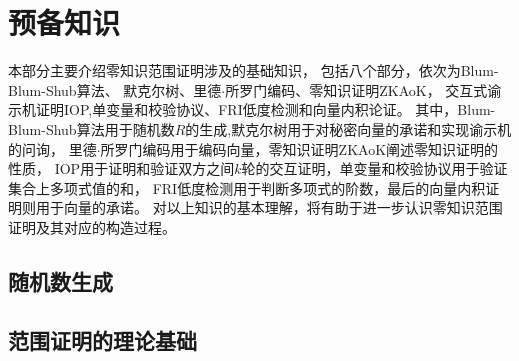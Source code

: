 \documentclass[zihao=-4]{ctexart}
\begin{document}

\section{预备知识}
本部分主要介绍零知识范围证明涉及的基础知识，
包括八个部分，依次为Blum-Blum-Shub算法、
默克尔树、里德$\cdot$所罗门编码、零知识证明ZKAoK，
交互式谕示机证明IOP,单变量和校验协议、FRI低度检测和向量内积论证。
其中，Blum-Blum-Shub算法用于随机数$R$的生成,默克尔树用于对秘密向量的承诺和实现谕示机的问询，
里德$\cdot$所罗门编码用于编码向量，零知识证明ZKAoK阐述零知识证明的性质，
IOP用于证明和验证双方之间$k$轮的交互证明，单变量和校验协议用于验证集合上多项式值的和，
FRI低度检测用于判断多项式的阶数，最后的向量内积证明则用于向量的承诺。
对以上知识的基本理解，将有助于进一步认识零知识范围证明及其对应的构造过程。
\subsection{随机数生成}

\subsection{范围证明的理论基础}
\end{document}
